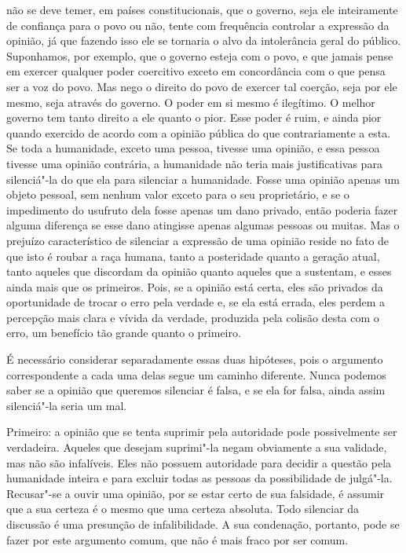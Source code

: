 não se deve temer, em países constitucionais, que o governo, 
seja ele inteiramente de confiança para o povo ou não, tente com frequência
controlar a expressão da opinião, já que fazendo isso ele se tornaria o
alvo da intolerância geral do público. Suponhamos, por exemplo, que o
governo esteja com o povo, e que jamais pense em exercer qualquer
poder coercitivo exceto em concordância com o que pensa ser a voz do
povo. Mas nego o direito do povo de exercer tal coerção, seja por ele
mesmo, seja através do governo. O poder em si mesmo é ilegítimo. O
melhor governo tem tanto direito a ele quanto o pior. Esse poder é
ruim, e ainda pior quando exercido de acordo com a opinião pública do
que contrariamente a esta. Se toda a humanidade, exceto uma pessoa, tivesse uma
opinião, e essa pessoa tivesse uma opinião contrária, a humanidade não
teria mais justificativas para silenciá"-la do que ela para silenciar a
humanidade. Fosse uma opinião apenas um objeto pessoal, sem nenhum
valor exceto para o seu proprietário, e se o impedimento do usufruto dela
fosse apenas um dano privado, então poderia fazer alguma diferença se esse
dano atingisse apenas algumas pessoas ou muitas. Mas o
prejuízo característico de silenciar a expressão de uma opinião reside no fato de que isto é
roubar a raça humana, tanto a posteridade quanto a geração atual, tanto
aqueles que discordam da opinião quanto aqueles que a sustentam, e esses
ainda mais que os primeiros. Pois, se a opinião está certa, eles são
privados da oportunidade de trocar o erro pela verdade e, se
ela está errada, eles perdem a
percepção mais clara e vívida da verdade, produzida pela colisão
desta com o erro, um benefício tão grande quanto o primeiro. 

É necessário considerar separadamente essas duas hipóteses, 
pois o argumento correspondente a cada uma delas segue um caminho diferente. Nunca podemos
saber se a opinião que queremos silenciar é falsa, e se ela for falsa,
ainda assim silenciá"-la seria um mal.

Primeiro: a opinião que se tenta suprimir pela autoridade pode
possivelmente ser verdadeira. Aqueles que desejam suprimi"-la negam
obviamente a sua validade, mas não são infalíveis. Eles não possuem
autoridade para decidir a questão pela humanidade inteira e para excluir
todas as pessoas da possibilidade de julgá"-la. Recusar"-se a ouvir
uma opinião, por se estar certo de sua falsidade, é assumir que a sua
certeza é o mesmo que uma certeza absoluta. Todo silenciar da discussão
é uma presunção de infalibilidade. A sua condenação, portanto, pode se
fazer por este argumento comum, que não é mais fraco por ser comum. 

